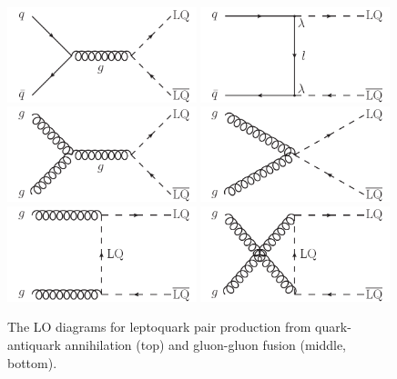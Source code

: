 \begin{figure}[hbt]
\begin{center}
\includegraphics[width=0.49\textwidth]{figures/LO_FD_LQ_pair_a.pdf}
\includegraphics[width=0.49\textwidth]{figures/LO_FD_LQ_pair_b.pdf}
\includegraphics[width=0.49\textwidth]{figures/LO_FD_LQ_pair_c.pdf}
\includegraphics[width=0.49\textwidth]{figures/LO_FD_LQ_pair_d.pdf}
\includegraphics[width=0.49\textwidth]{figures/LO_FD_LQ_pair_e.pdf}
\includegraphics[width=0.49\textwidth]{figures/LO_FD_LQ_pair_f.pdf}
\caption{The LO diagrams for leptoquark pair production from quark-antiquark annihilation (top) and gluon-gluon fusion (middle, bottom).}
\label{fig:lq-diagrams}
\end{center}
\end{figure}

